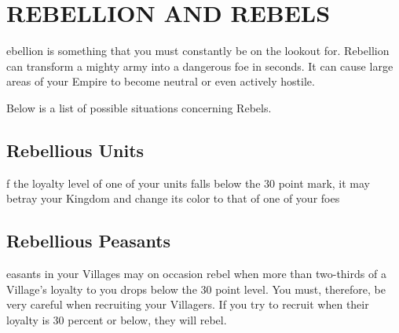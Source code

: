 
\chapter[Rebellion and Rebels]{\textsf{{\Huge R}EBELLION AND {\Huge R}EBELS}}

ebellion is something that you must constantly be on the lookout for. Rebellion can transform a mighty army into a dangerous foe in seconds. It can cause large areas of your Empire to become neutral or even actively hostile.

Below is a list of possible situations concerning Rebels.

\section{\textsf{Rebellious Units}}


f the loyalty level of one of your units falls below the 30 point mark, it may betray your Kingdom and change its color to that of one of your foes

\section{\textsf{Rebellious Peasants}}


easants in your Villages may on occasion rebel when more than two-thirds of a Village’s loyalty to you drops below the 30 point level. You must, therefore, be very careful when recruiting your Villagers. If you try to recruit when their loyalty is 30 percent or below, they will rebel.

